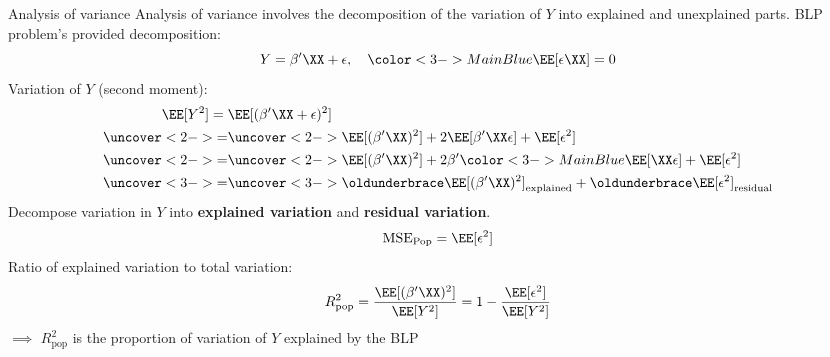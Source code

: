 \documentclass[compress, 8pt]{beamer}
\begin{document}
\begin{frame}{Analysis of variance}
    Analysis of variance involves the decomposition of the variation of $Y$ into explained and unexplained parts. BLP problem's provided decomposition:
    \begin{equation*}
        Y = \beta^\prime \XX + \epsilon, \quad {\color<3->{MainBlue} \EE [\epsilon \XX] = 0}
    \end{equation*}
    Variation of $Y$ (second moment):
    \begin{align*}
        \EE[Y^2] ={}& \EE [(\beta^\prime \XX + \epsilon)^2] \\
        \uncover<2->{=}& \uncover<2->{\EE [(\beta^\prime \XX)^2] + 2 \EE [\beta^\prime \XX \epsilon] + \EE [\epsilon^2]} \\
        \uncover<2->{=}& \uncover<2->{\EE [(\beta^\prime \XX)^2] + 2 \beta^\prime {\color<3->{MainBlue} \EE [\XX \epsilon]} + \EE [\epsilon^2]} \\
        \uncover<3->{=}& \uncover<3->{\underbrace{\EE [(\beta^\prime \XX)^2 ]}_{\text{explained}} + \underbrace{\EE [\epsilon^2]}_{\text{residual}}} 
    \end{align*}
    Decompose variation in $Y$ into \textbf{explained variation} and \textbf{residual variation}.
    \begin{equation*}
        \text{MSE}_{\text{Pop}} = \EE [\epsilon^2]
    \end{equation*}
    Ratio of explained variation to total variation:
    \begin{equation*}
        R^2_{\text{pop}} = \frac{\EE[(\beta^\prime \XX)^2]}{\EE[Y^2]} = 1 - \frac{\EE [\epsilon^2]}{\EE [Y^2]}
    \end{equation*}
    $\implies$ $R^2_{\text{pop}}$ is the proportion of variation of $Y$ explained by the BLP

\end{frame}
\end{document}
